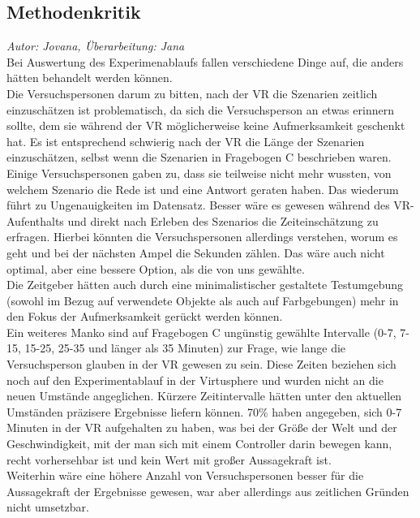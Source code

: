\documentclass{Bericht}
\begin{document}
\label{subsec:kritik}
\subsection{Methodenkritik}
\textit{Autor: Jovana, Überarbeitung: Jana}\\
Bei Auswertung des Experimenablaufs fallen verschiedene Dinge auf, die anders hätten behandelt werden können.\\
Die Versuchspersonen darum zu bitten, nach der VR die Szenarien zeitlich einzuschätzen ist problematisch, da sich die Versuchsperson an etwas erinnern sollte, dem sie während der VR möglicherweise keine Aufmerksamkeit geschenkt hat.
 Es ist entsprechend schwierig nach der VR die Länge der Szenarien einzuschätzen, selbst wenn die Szenarien in Fragebogen C beschrieben waren. Einige Versuchspersonen gaben zu, dass sie teilweise nicht mehr wussten, von welchem Szenario die Rede ist und eine Antwort geraten haben. Das wiederum führt zu Ungenauigkeiten im Datensatz. 
 Besser wäre es gewesen während des VR-Aufenthalts und direkt nach Erleben des Szenarios die Zeiteinschätzung zu erfragen. Hierbei könnten die Versuchspersonen allerdings verstehen, worum es geht und bei der nächsten Ampel die Sekunden zählen. Das wäre auch nicht optimal, aber eine bessere Option, als die von uns gewählte.\\
Die Zeitgeber hätten auch durch eine minimalistischer gestaltete Testumgebung (sowohl im Bezug auf verwendete Objekte als auch auf Farbgebungen) mehr in den Fokus der Aufmerksamkeit gerückt werden können.\\
Ein weiteres Manko sind auf Fragebogen C ungünstig gewählte Intervalle (0-7, 7-15, 15-25, 25-35 und länger als 35 Minuten) zur Frage, wie lange die Versuchsperson glauben in der VR gewesen zu sein. Diese Zeiten beziehen sich noch auf den Experimentablauf in der Virtusphere und wurden nicht an die neuen Umstände angeglichen. 
Kürzere Zeitintervalle hätten unter den aktuellen Umständen präzisere Ergebnisse liefern können. 70\% haben angegeben, sich 0-7 Minuten in der VR aufgehalten zu haben, was bei der Größe der Welt und der Geschwindigkeit, mit der man sich mit einem Controller darin bewegen kann, recht vorhersehbar ist und kein Wert mit großer Aussagekraft ist.\\
Weiterhin wäre eine höhere Anzahl von Versuchspersonen besser für die Aussagekraft der Ergebnisse gewesen, war aber allerdings aus zeitlichen Gründen nicht umsetzbar.
\end{document}
